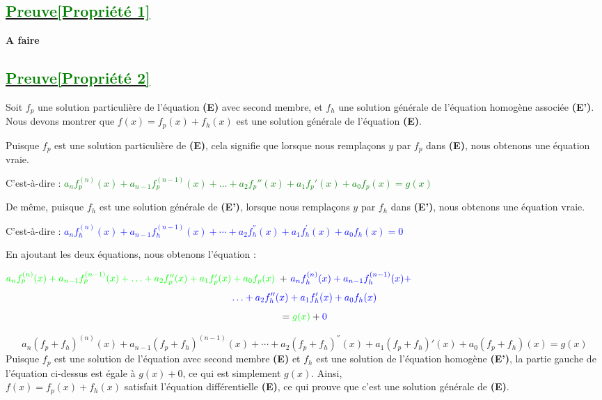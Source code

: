 \documentclass[12pt,a4paper]{article}
\begin{document}
\subsection*{\underline{\textbf{\textcolor{green}{Preuve[Propriété 1]}}}}
\textbf{A faire}
\subsection*{\underline{\textbf{\textcolor{green}{Preuve[Propriété 2]}}}}
Soit $f_p$ une solution particulière de l'équation \textbf{(E)} avec second membre, et $f_h$ une solution générale de l'équation homogène associée \textbf{(E')}. Nous devons montrer que $f(x) = f_p(x) + f_h(x) $ est une solution générale de l'équation \textbf{(E)}.

Puisque $f_p$ est une solution particulière de \textbf{(E)}, cela signifie que lorsque nous remplaçons $y$ par $f_p$ dans \textbf{(E)}, nous obtenons une équation vraie. 

C'est-à-dire : \textcolor{green}{$ a_{n}f_p^{(n)}(x) + a_{n-1}f_p^{(n-1)}(x) + \ldots + a_{2}f_{p}''(x) + a_{1}f_{p}'(x) + a_{0}f_{p}(x)=g(x) $}

De même, puisque $f_h$ est une solution générale de \textbf{(E')}, lorsque nous remplaçons $y$ par $f_h$ dans \textbf{(E')}, nous obtenons une équation vraie.

C'est-à-dire : \textcolor{blue}{$ a_{n}f_{h}^{(n)}(x)+a_{n-1}f_{h}^{(n-1)}(x)+\cdots+a_{2}f_{h}^{''}(x)+a_{1}f_{h}^{'}(x)+a_{0}f_{h}(x)=0 $}

En ajoutant les deux équations, nous obtenons l'équation :

$\textcolor{green}{a_{n}f_p^{(n)}(x) + a_{n-1}f_p^{(n-1)}(x) + \ldots + a_{2}f_{p}''(x) + a_{1}f_{p}'(x) + a_{0}f_{p}(x)}$ + $\textcolor{blue}{a_{n}f_h^{(n)}(x) + a_{n-1}f_h^{(n-1)}(x) +}$ 
\[\textcolor{blue}{\ldots + a_{2}f_{h}''(x) + a_{1}f_{h}'(x) + a_{0}f_{h}(x)}\]
\[=\textcolor{green}{g(x)}+\textcolor{blue}{0}\]

\[a_{n}(f_{p}+f_{h})^{(n)}(x)+a_{n-1}(f_{p}+f_{h})^{(n-1)}(x)+\cdots+a_{2}(f_{p}+f_{h})^{''}(x)+a_{1}(f_{p}+f_{h})'(x)+a_{0}(f_{p}+f_{h})(x)=g(x)\]
Puisque $f_p$ est une solution de l'équation avec second membre \textbf{(E)} et $f_h$ est une solution de l'équation homogène \textbf{(E')}, la partie gauche de l'équation ci-dessus est égale à $g(x) + 0$, ce qui est simplement $g(x)$. Ainsi,\\ $f(x) = f_p(x) + f_h(x)$ satisfait l'équation différentielle \textbf{(E)}, ce qui prouve que c'est une solution générale de \textbf{(E)}.
\end{document}
